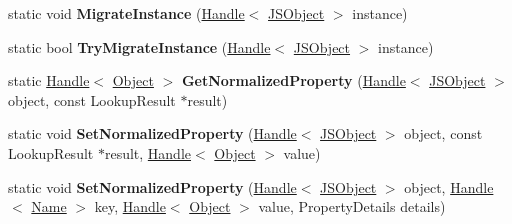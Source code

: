 \begin{DoxyCompactItemize}
\item 
\hypertarget{classv8_1_1internal_1_1_j_s_object_aecc850e35fb6912ed2d5b786abad1f64}{}static void {\bfseries Migrate\+Instance} (\hyperlink{classv8_1_1internal_1_1_handle}{Handle}$<$ \hyperlink{classv8_1_1internal_1_1_j_s_object}{J\+S\+Object} $>$ instance)\label{classv8_1_1internal_1_1_j_s_object_aecc850e35fb6912ed2d5b786abad1f64}

\item 
\hypertarget{classv8_1_1internal_1_1_j_s_object_a95233ff548a330733c02362f81275abb}{}static bool {\bfseries Try\+Migrate\+Instance} (\hyperlink{classv8_1_1internal_1_1_handle}{Handle}$<$ \hyperlink{classv8_1_1internal_1_1_j_s_object}{J\+S\+Object} $>$ instance)\label{classv8_1_1internal_1_1_j_s_object_a95233ff548a330733c02362f81275abb}

\item 
\hypertarget{classv8_1_1internal_1_1_j_s_object_a54ae03759ab1ac43a5d7e699bdc8903f}{}static \hyperlink{classv8_1_1internal_1_1_handle}{Handle}$<$ \hyperlink{classv8_1_1internal_1_1_object}{Object} $>$ {\bfseries Get\+Normalized\+Property} (\hyperlink{classv8_1_1internal_1_1_handle}{Handle}$<$ \hyperlink{classv8_1_1internal_1_1_j_s_object}{J\+S\+Object} $>$ object, const Lookup\+Result $\ast$result)\label{classv8_1_1internal_1_1_j_s_object_a54ae03759ab1ac43a5d7e699bdc8903f}

\item 
\hypertarget{classv8_1_1internal_1_1_j_s_object_a26572ffdfdf1b46fa21448c5db6c45ac}{}static void {\bfseries Set\+Normalized\+Property} (\hyperlink{classv8_1_1internal_1_1_handle}{Handle}$<$ \hyperlink{classv8_1_1internal_1_1_j_s_object}{J\+S\+Object} $>$ object, const Lookup\+Result $\ast$result, \hyperlink{classv8_1_1internal_1_1_handle}{Handle}$<$ \hyperlink{classv8_1_1internal_1_1_object}{Object} $>$ value)\label{classv8_1_1internal_1_1_j_s_object_a26572ffdfdf1b46fa21448c5db6c45ac}

\item 
\hypertarget{classv8_1_1internal_1_1_j_s_object_afdb3457f02f6488da113fc0b8594defc}{}static void {\bfseries Set\+Normalized\+Property} (\hyperlink{classv8_1_1internal_1_1_handle}{Handle}$<$ \hyperlink{classv8_1_1internal_1_1_j_s_object}{J\+S\+Object} $>$ object, \hyperlink{classv8_1_1internal_1_1_handle}{Handle}$<$ \hyperlink{classv8_1_1internal_1_1_name}{Name} $>$ key, \hyperlink{classv8_1_1internal_1_1_handle}{Handle}$<$ \hyperlink{classv8_1_1internal_1_1_object}{Object} $>$ value, Property\+Details details)\label{classv8_1_1internal_1_1_j_s_object_afdb3457f02f6488da113fc0b8594defc}


\end{DoxyCompactItemize}

